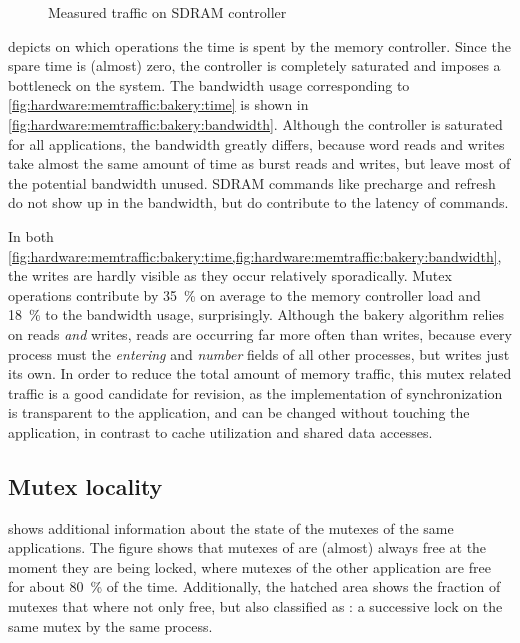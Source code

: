 \begin{figure}%
%
\caption{Measured traffic on \acs{SDRAM} controller}%
\label{fig:hardware:memtraffic:bakery}%
\end{figure}


 depicts on which operations the time is spent by the memory controller.
Since the spare time is (almost) zero, the controller is completely saturated and imposes a bottleneck on the system.
The bandwidth usage corresponding to \cref{fig:hardware:memtraffic:bakery:time} is shown in \cref{fig:hardware:memtraffic:bakery:bandwidth}.
Although the controller is saturated for all applications, the bandwidth greatly differs, because word reads and writes take almost the same amount of time as burst reads and writes, but leave most of the potential bandwidth unused.
\Ac{SDRAM} commands like precharge and refresh do not show up in the bandwidth, but do contribute to the latency of commands.

In both \cref{fig:hardware:memtraffic:bakery:time,fig:hardware:memtraffic:bakery:bandwidth}, the writes are hardly visible as they occur relatively sporadically.
Mutex operations contribute by \SI{35}{\percent} on average to the memory controller load and \SI{18}{\percent} to the bandwidth usage, surprisingly.
Although the bakery algorithm relies on reads \emph{and} writes, reads are occurring far more often than writes, because every process must  the \emph{entering} and \emph{number} fields of all other processes, but writes just its own.
In order to reduce the total amount of memory traffic, this mutex related traffic is a good candidate for revision, as the implementation of synchronization is transparent to the application, and can be changed without touching the application, in contrast to cache utilization and shared data accesses.

\subsection{Mutex locality}

 shows additional information about the state of the mutexes of the same applications.
The figure shows that mutexes of  are (almost) always free at the moment they are being locked, where mutexes of the other application are free for about \SI{80}{\percent} of the time.
Additionally, the hatched area shows the fraction of mutexes that where not only free, but also classified as \emph{}: a successive lock on the same mutex by the same process.

